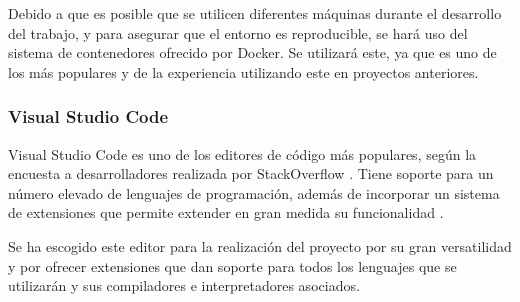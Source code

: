 Debido a que es posible que se utilicen diferentes máquinas durante el desarrollo del trabajo, y para asegurar que el entorno es reproducible, se hará uso del sistema de contenedores ofrecido por Docker. Se utilizará este, ya que es uno de los más populares y de la experiencia utilizando este en proyectos anteriores.

\subsubsection{Visual Studio Code}

Visual Studio Code es uno de los editores de código más populares, según la encuesta a desarrolladores realizada por StackOverflow \cite{2023devsurvey}. Tiene soporte para un número elevado de lenguajes de programación, además de incorporar un sistema de extensiones que permite extender en gran medida su funcionalidad \cite{vscodeweb}.

Se ha escogido este editor para la realización del proyecto por su gran versatilidad y por ofrecer extensiones que dan soporte para todos los lenguajes que se utilizarán y sus compiladores e interpretadores asociados.
